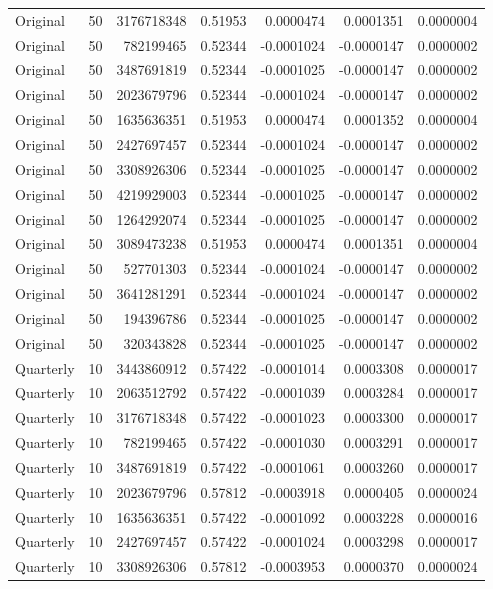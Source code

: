 \begin{longtable}{llrrrrr}
Original & 50 & 3176718348 & 0.51953 & 0.0000474 & 0.0001351 & 0.0000004 \\
Original & 50 & 782199465 & 0.52344 & -0.0001024 & -0.0000147 & 0.0000002 \\
Original & 50 & 3487691819 & 0.52344 & -0.0001025 & -0.0000147 & 0.0000002 \\
Original & 50 & 2023679796 & 0.52344 & -0.0001024 & -0.0000147 & 0.0000002 \\
Original & 50 & 1635636351 & 0.51953 & 0.0000474 & 0.0001352 & 0.0000004 \\
Original & 50 & 2427697457 & 0.52344 & -0.0001024 & -0.0000147 & 0.0000002 \\
Original & 50 & 3308926306 & 0.52344 & -0.0001025 & -0.0000147 & 0.0000002 \\
Original & 50 & 4219929003 & 0.52344 & -0.0001025 & -0.0000147 & 0.0000002 \\
Original & 50 & 1264292074 & 0.52344 & -0.0001025 & -0.0000147 & 0.0000002 \\
Original & 50 & 3089473238 & 0.51953 & 0.0000474 & 0.0001351 & 0.0000004 \\
Original & 50 & 527701303 & 0.52344 & -0.0001024 & -0.0000147 & 0.0000002 \\
Original & 50 & 3641281291 & 0.52344 & -0.0001024 & -0.0000147 & 0.0000002 \\
Original & 50 & 194396786 & 0.52344 & -0.0001025 & -0.0000147 & 0.0000002 \\
Original & 50 & 320343828 & 0.52344 & -0.0001025 & -0.0000147 & 0.0000002 \\
Quarterly & 10 & 3443860912 & 0.57422 & -0.0001014 & 0.0003308 & 0.0000017 \\
Quarterly & 10 & 2063512792 & 0.57422 & -0.0001039 & 0.0003284 & 0.0000017 \\
Quarterly & 10 & 3176718348 & 0.57422 & -0.0001023 & 0.0003300 & 0.0000017 \\
Quarterly & 10 & 782199465 & 0.57422 & -0.0001030 & 0.0003291 & 0.0000017 \\
Quarterly & 10 & 3487691819 & 0.57422 & -0.0001061 & 0.0003260 & 0.0000017 \\
Quarterly & 10 & 2023679796 & 0.57812 & -0.0003918 & 0.0000405 & 0.0000024 \\
Quarterly & 10 & 1635636351 & 0.57422 & -0.0001092 & 0.0003228 & 0.0000016 \\
Quarterly & 10 & 2427697457 & 0.57422 & -0.0001024 & 0.0003298 & 0.0000017 \\
Quarterly & 10 & 3308926306 & 0.57812 & -0.0003953 & 0.0000370 & 0.0000024 \\

\end{longtable}
